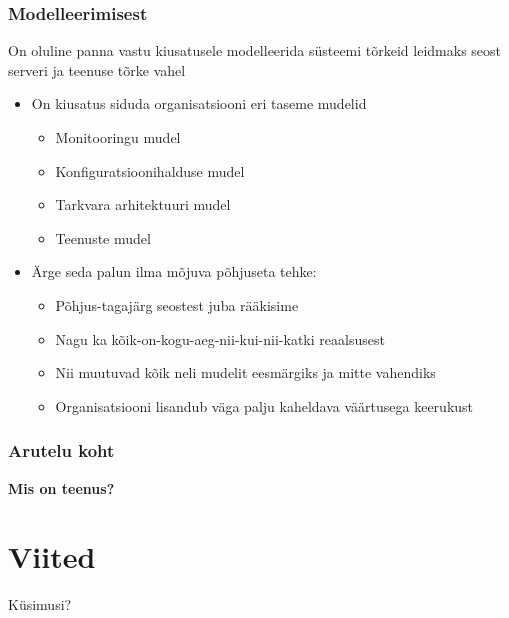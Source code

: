 \begin{frame}[fragile]
  \frametitle{Modelleerimisest}
	On oluline panna vastu kiusatusele modelleerida süsteemi tõrkeid leidmaks seost serveri ja teenuse tõrke vahel
		\begin{itemize}
			\item On kiusatus siduda organisatsiooni eri taseme mudelid
			\begin{itemize}
				\item Monitooringu mudel
				\item Konfiguratsioonihalduse mudel
				\item Tarkvara arhitektuuri mudel
				\item Teenuste mudel
			\end{itemize}
			\item Ärge seda palun ilma mõjuva põhjuseta tehke:
			\begin{itemize}
				\item Põhjus-tagajärg seostest juba rääkisime
				\item Nagu ka kõik-on-kogu-aeg-nii-kui-nii-katki reaalsusest
				\item Nii muutuvad kõik neli mudelit eesmärgiks ja mitte vahendiks
				\item Organisatsiooni lisandub väga palju kaheldava väärtusega keerukust
			\end{itemize}
			
		\end{itemize}		
\end{frame}

\begin{frame}[fragile]
  \frametitle{Arutelu koht}
		\begin{center}
			\textbf{Mis on teenus?}
		\end{center}
\end{frame}


\section{Viited}

\begin{frame}[t,allowframebreaks,]
  	
	 

\end{frame}

\begin{frame}[plain]
	\begin{center}Küsimusi?\end{center}
\end{frame}


